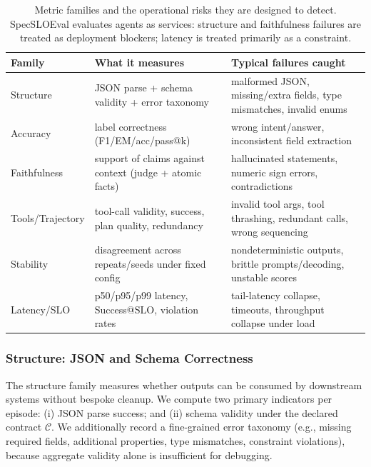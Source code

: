 \documentclass[11pt]{article}
\newcommand{\slo}{\ensuremath{\mathrm{SLO}}}
\begin{document}
\begin{table}[t]
\centering
\small
\begin{tabular}{@{}p{2.4cm}p{5.3cm}p{5.2cm}@{}}
\toprule
\textbf{Family} & \textbf{What it measures} & \textbf{Typical failures caught} \\
\midrule
Structure & JSON parse + schema validity + error taxonomy & malformed JSON, missing/extra fields, type mismatches, invalid enums \\
Accuracy & label correctness (F1/EM/acc/pass@k) & wrong intent/answer, inconsistent field extraction \\
Faithfulness & support of claims against context (judge + atomic facts) & hallucinated statements, numeric sign errors, contradictions \\
Tools/\newline Trajectory & tool-call validity, success, plan quality, \newline redundancy & invalid tool args, tool thrashing, redundant calls, wrong sequencing \\
Stability & disagreement across repeats/seeds under fixed config & nondeterministic outputs, brittle prompts/decoding, unstable scores \\
Latency/SLO & p50/p95/p99 latency, Success@\slo, violation rates & tail-latency collapse, timeouts, throughput collapse under load \\
\bottomrule
\end{tabular}
\caption{Metric families and the operational risks they are designed to detect.
SpecSLOEval evaluates agents as services: structure and faithfulness failures are treated as deployment blockers; latency is treated primarily as a constraint.}
\label{tab:families}
\end{table}

\subsubsection{Structure: JSON and Schema Correctness}

The structure family measures whether outputs can be consumed by downstream systems without bespoke cleanup.
We compute two primary indicators per episode:
(i) JSON parse success; and (ii) schema validity under the declared contract $\mathcal{C}$.
We additionally record a fine-grained error taxonomy (e.g., missing required fields, additional properties, type mismatches, constraint violations), because aggregate validity alone is insufficient for debugging.
\end{document}
